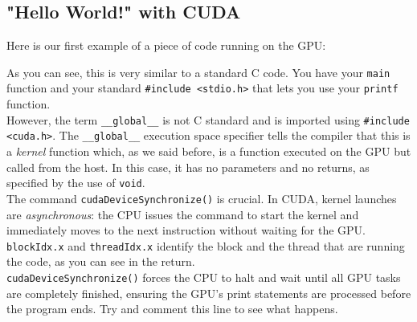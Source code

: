 \subsection{"Hello World!" with CUDA}

Here is our first example of a piece of code running on the GPU:



As you can see, this is very similar to a standard C code. You have your \texttt{main} function and your standard \texttt{\#include <stdio.h>} that lets you use your \texttt{printf} function. \\ However, the term \texttt{\_\_global\_\_} is not C standard and is imported using \texttt{\#include <cuda.h>}. The \texttt{\_\_global\_\_} execution space specifier tells the compiler that this is a \textit{kernel} function which, as we said before, is a function executed on the GPU but called from the host. In this case, it has no parameters and no returns, as specified by the use of \texttt{void}. \\ 
The command \texttt{cudaDeviceSynchronize()} is crucial. In CUDA, kernel launches are \textit{asynchronous}: the CPU issues the command to start the kernel and immediately moves to the next instruction without waiting for the GPU. \\
\texttt{blockIdx.x} and \texttt{threadIdx.x} identify the block and the thread that are running the code, as you can see in the return. \\
\texttt{cudaDeviceSynchronize()} forces the CPU to halt and wait until all GPU tasks are completely finished, ensuring the GPU's print statements are processed before the program ends. Try and comment this line to see what happens.

